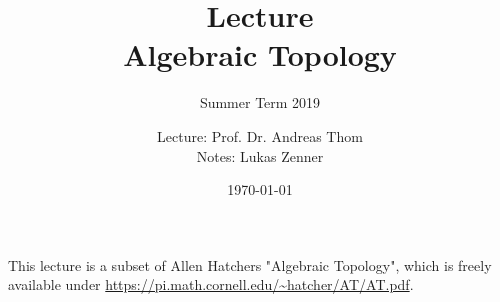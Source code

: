 \documentclass[]{scrreprt}
\title{
	Lecture\\
	Algebraic Topology
}
\subtitle{Summer Term 2019}
\author{
	Lecture:  Prof. Dr. Andreas Thom\\
	Notes: Lukas Zenner
}
\date{\today}
\begin{document}
	\makeatletter
  	\renewcommand{\@pnumwidth}{2em}
  	\makeatother
  	
  	
	\maketitle
	
	
	This lecture is a subset of Allen Hatchers "Algebraic Topology", which is freely available under 
	\url{https://pi.math.cornell.edu/~hatcher/AT/AT.pdf}.
	
	\appendix
	
	\newcommand{\pathPrefix}{Loesungen/}

	\printindex %
\end{document}
